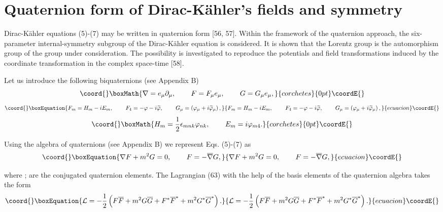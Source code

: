 \documentclass[a4paper,12pt]{article}
\begin{document}
\section{Quaternion form of Dirac-K\"ahler's fields and
symmetry}

Dirac-K\"ahler equations (5)-(7) may be written in quaternion form [56, 57].
Within the framework of the quaternion approach, the six-parameter
internal-symmetry subgroup of the Dirac-K\"ahler equation is considered. It
is shown that the Lorentz group is the automorphism group of the group under
consideration. The possibility is investigated to reproduce the potentials
and field transformations induced by the coordinate transformation in the
complex space-time [58].

Let us introduce the following biquaternions (see Appendix B)
\[\coord{}\boxMath{
\nabla =e_\mu \partial _\mu ,\hspace{0.3in}F=F_\mu e_\mu
,\hspace{0.3in} G=G_\mu e_\mu ,
}{corchetes}{0pt}\coordE{}\]
\begin{equation}\coord{}\boxEquation{
F_m=H_m-iE_m,\hspace{0.3in}F_4=-\varphi-i\widetilde{\varphi
},\hspace{0.3in}G_\mu =\left(\varphi_\mu +i\widetilde{\varphi}_\mu
\right), \label{72}
}{
F_m=H_m-iE_m,\hspace{0.3in}F_4=-\varphi-i\widetilde{\varphi
},\hspace{0.3in}G_\mu =\left(\varphi_\mu +i\widetilde{\varphi}_\mu
\right), }{ecuacion}\coordE{}\end{equation}
\[\coord{}\boxMath{
H_m=\frac 12\epsilon _{mnk}\varphi
_{nk},\hspace{0.3in}E_m=i\varphi _{m4}.
}{corchetes}{0pt}\coordE{}\]

Using the algebra of quaternions (see Appendix B) we represent Eqs. (5)-(7)
as
\begin{equation}\coord{}\boxEquation{
\nabla F+m^2G=0,\hspace{0.3in}F=-\overline{\nabla }G,  \label{73}
}{
\nabla F+m^2G=0,\hspace{0.3in}F=-\overline{\nabla }G,  }{ecuacion}\coordE{}\end{equation}

where \coordHE{};
\coordHE{} are the conjugated quaternion
elements. The Lagrangian (63) with the help of the basis elements
of the quaternion algebra takes the form
\begin{equation}\coord{}\boxEquation{
\mathcal{L}=-\frac 12\left(
F\overline{F}+m^2G\overline{G}+F^{*}\overline{F}
^{*}+m^2G^{*}\overline{G}^{*}\right) .  \label{74}
}{
\mathcal{L}=-\frac 12\left(
F\overline{F}+m^2G\overline{G}+F^{*}\overline{F}
^{*}+m^2G^{*}\overline{G}^{*}\right) .  }{ecuacion}\coordE{}\end{equation}
\end{document}
